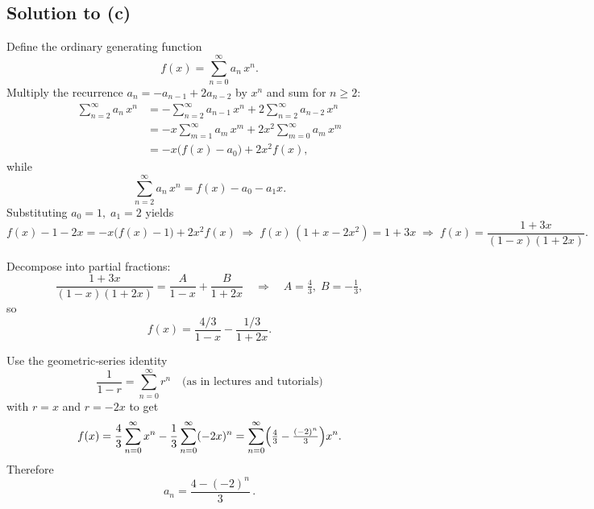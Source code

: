 \documentclass[docmute]{article}
\begin{document}
\subsection*{Solution to (c)}
Define the ordinary generating function
\[
f(x)=\sum_{n=0}^\infty a_n\,x^n.
\]
Multiply the recurrence \(a_n=-a_{n-1}+2a_{n-2}\) by \(x^n\) and sum for \(n\ge2\):
\begin{align*}
\sum_{n=2}^\infty a_n\,x^n
&=-\sum_{n=2}^\infty a_{n-1}\,x^n
+2\sum_{n=2}^\infty a_{n-2}\,x^n\\
&=-x\sum_{m=1}^\infty a_m\,x^m
+2x^2\sum_{m=0}^\infty a_m\,x^m\\
&=-x\bigl(f(x)-a_0\bigr)+2x^2f(x),
\end{align*}
while
\[
\sum_{n=2}^\infty a_n\,x^n=f(x)-a_0-a_1x.
\]
Substituting \(a_0=1,\;a_1=2\) yields
\[
f(x)-1-2x
=-x\bigl(f(x)-1\bigr)+2x^2f(x)
\;\Longrightarrow\;
f(x)\,(1+x-2x^2)=1+3x
\;\Longrightarrow\;
f(x)=\frac{1+3x}{(1-x)(1+2x)}.
\]

Decompose into partial fractions:
\[
\frac{1+3x}{(1-x)(1+2x)}
=\frac{A}{1-x}+\frac{B}{1+2x}
\quad\Longrightarrow\quad
A=\tfrac{4}{3},\;B=-\tfrac{1}{3},
\]
so
\[
f(x)
=\frac{4/3}{1-x}-\frac{1/3}{1+2x}.
\]

Use the geometric‐series identity
\[
\boxed{
\frac{1}{1-r}
=\sum_{n=0}^\infty r^n
\quad\text{(as in lectures and tutorials)}
}
\]
with \(r=x\) and \(r=-2x\) to get
\[
f(x)
=\frac{4}{3}\sum_{n=0}^\infty x^n
-\frac{1}{3}\sum_{n=0}^\infty(-2x)^n
=\sum_{n=0}^\infty\Bigl(\tfrac{4}{3}-\tfrac{(-2)^n}{3}\Bigr)x^n.
\]
Therefore
\[
\boxed{a_n=\frac{4-(-2)^n}{3}\,.}
\]
\end{document}
